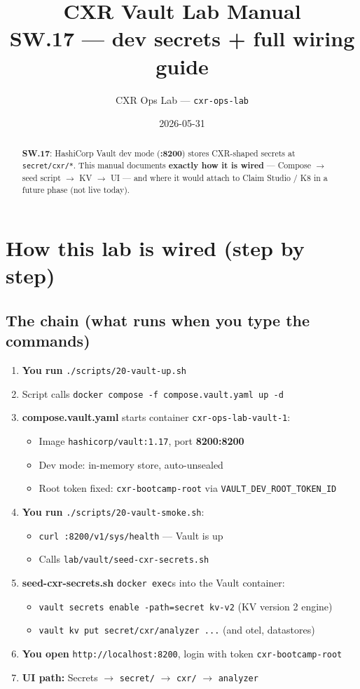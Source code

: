\documentclass[11pt,a4paper]{report}
\title{CXR Vault Lab Manual\\
\large SW.17 --- dev secrets + full wiring guide}
\author{CXR Ops Lab --- \texttt{cxr-ops-lab}}
\date{2026-05-31}
\begin{document}
\maketitle
\begin{abstract}
\textbf{SW.17}: HashiCorp Vault dev mode (\textbf{:8200}) stores CXR-shaped secrets at
\texttt{secret/cxr/*}. This manual documents \textbf{exactly how it is wired} ---
Compose $\rightarrow$ seed script $\rightarrow$ KV $\rightarrow$ UI --- and where it would
attach to Claim Studio / K8 in a future phase (not live today).
\end{abstract}
\tableofcontents
\newpage

\chapter{How this lab is wired (step by step)}

\section{The chain (what runs when you type the commands)}

\begin{enumerate}
  \item \textbf{You run} \texttt{./scripts/20-vault-up.sh}
  \item Script calls \texttt{docker compose -f compose.vault.yaml up -d}
  \item \textbf{compose.vault.yaml} starts container \texttt{cxr-ops-lab-vault-1}:
    \begin{itemize}
      \item Image \texttt{hashicorp/vault:1.17}, port \textbf{8200:8200}
      \item Dev mode: in-memory store, auto-unsealed
      \item Root token fixed: \texttt{cxr-bootcamp-root} via \texttt{VAULT\_DEV\_ROOT\_TOKEN\_ID}
    \end{itemize}
  \item \textbf{You run} \texttt{./scripts/20-vault-smoke.sh}:
    \begin{itemize}
      \item \texttt{curl :8200/v1/sys/health} --- Vault is up
      \item Calls \texttt{lab/vault/seed-cxr-secrets.sh}
    \end{itemize}
  \item \textbf{seed-cxr-secrets.sh} \texttt{docker exec}s into the Vault container:
    \begin{itemize}
      \item \texttt{vault secrets enable -path=secret kv-v2} (KV version 2 engine)
      \item \texttt{vault kv put secret/cxr/analyzer ...} (and otel, datastores)
    \end{itemize}
  \item \textbf{You open} \texttt{http://localhost:8200}, login with token \texttt{cxr-bootcamp-root}
  \item \textbf{UI path:} Secrets $\rightarrow$ \texttt{secret/} $\rightarrow$ \texttt{cxr/} $\rightarrow$ \texttt{analyzer}
\end{enumerate}
\end{document}
